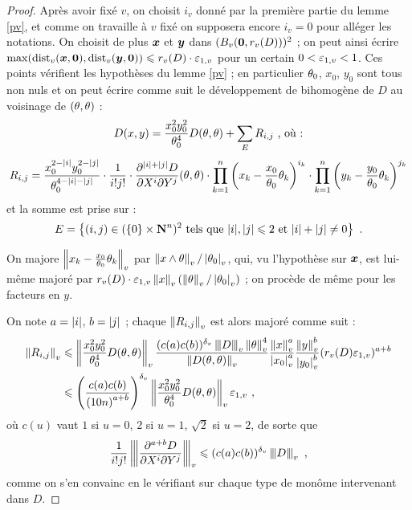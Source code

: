 \begin{proof}
  Après avoir fixé $v$, on choisit $i_v$ donné par la première partie du lemme
  \ref{pv}, et comme on travaille à $v$ fixé on supposera encore $i_v = 0$
  pour alléger les notations. On choisit de plus ${\boldsymbol{x}}$ et ${\boldsymbol{y}}$ dans
  $(B_v({\boldsymbol{0}}, r_v(D)))^2$ ; on peut ainsi écrire $\max(\mathrm{dist}_v({\boldsymbol{x}}, {\boldsymbol{0}}), \mathrm{dist}_v({\boldsymbol{y}}, {\boldsymbol{0}})) \leqslant r_v(D)\cdot\varepsilon_{1, v}$ pour un certain $0 < \varepsilon_{1, v} < 1$.
  Ces points vérifient  les hypothèses du lemme \ref{pv} ; en
  particulier $\theta_0$, $x_0$, $y_0$ sont tous non nuls et on peut écrire
  comme suit le développement de  bihomogène de $D$ au voisinage
  de $(\theta, \theta)$ :
  \[
  D(x, y) = \frac{x_0^2y_0^2}{\theta_0^4}D(\theta, \theta) + \sum_E R_{i, j}
  \text{ , où :}
  \]
  \[
  R_{i, j} =
  \frac{x_0^{2-{|i|}}y_0^{2-{|j|}}}{\theta_0^{4-{|i|}-{|j|}}}\cdot
  \frac{1}{i!j!} \cdot
  \frac{\partial^{{|i|}+{|j|}}D}{\partial X^i \partial Y^j}(\theta, \theta)
  \cdot
  \prod_{k=1}^n \left( x_{k} - \frac{x_0}{\theta_0} \theta_{k} \right)^{i_k}
  \cdot \prod_{k=1}^n \left( y_{k} - \frac{y_0}{\theta_0} \theta_{k}
  \right)^{j_k}
  \]
  et la somme est prise sur :
  \[
  E = \left\{ (i, j) \in (\{0\} \times \mathbf{N}^n)^2 \text{ tels que }
    {|i|},{|j|} \leqslant 2 \text{ et } {|i|}+{|j|} \neq 0 \right\}
  \text{ .}
  \]

  On majore $\left\lVert x_k - \frac{x_0}{\theta_0} \theta_k\right\rVert_{v}$ par $\left\lVert x \wedge
  \theta\right\rVert_{v}/\left\lvert\theta_0\right\rvert_{v}$, qui, vu l'hypothèse sur ${\boldsymbol{x}}$, est lui-même majoré
  par $r_v(D)\cdot\varepsilon_{1, v} \left\lVert x\right\rVert_{v} (\left\lVert\theta\right\rVert_{v}/\left\lvert\theta_0\right\rvert_{v})$ ; on procède de
  même pour les facteurs en $y$.

  On note $a = {|i|}$, $b={|j|}$ ; chaque $\left\lVert R_{i, j}\right\rVert_{v}$ est alors majoré
  comme suit :
  \begin{align*}
  \left\lVert R_{i, j}\right\rVert_{v} & \leqslant
  \left\lVert\frac{x_0^2y_0^2}{\theta_0^4}D(\theta, \theta)\right\rVert_{v}
  \frac{(c(a)c(b))^{\delta_v} \left\lvert\hspace{-1pt} \left\lvert\hspace{-1pt} \left\lvert D\right\rvert \hspace{-1pt}\right\rvert \hspace{-1pt}\right\rvert_{v}\left\lVert\theta\right\rVert_{v}^4}{\left\lVert D(\theta, \theta)\right\rVert_{v}}
  \frac{\left\lVert x\right\rVert_{v}^a}{\left\lvert x_0\right\rvert_{v}^a} \frac{\left\lVert y\right\rVert_{v}^b}{\left\lvert y_0\right\rvert_{v}^b} (r_v(D)\varepsilon_{1,
    v})^{a+b}\\
  & \leqslant \left( \frac{c(a)c(b)}{\left( 10n \right)^{a+b}} \right)^{\delta_v}
  \left\lVert\frac{x_0^2y_0^2}{\theta_0^4}D(\theta, \theta)\right\rVert_{v} \varepsilon_{1, v} \text{ ,}
  \end{align*}
  où $c(u)$ vaut $1$ si $u=0$, $2$ si $u=1$, $\sqrt{2}$ si $u=2$, de sorte que
  \[
  \frac{1}{i!j!}\left\lvert\hspace{-1pt} \left\lvert\hspace{-1pt} \left\lvert\frac{\partial^{a+b}D}{\partial X^i \partial Y^j}\right\rvert \hspace{-1pt}\right\rvert \hspace{-1pt}\right\rvert_{v} \leqslant
  (c(a) c(b))^{\delta_v} \left\lvert\hspace{-1pt} \left\lvert\hspace{-1pt} \left\lvert D\right\rvert \hspace{-1pt}\right\rvert \hspace{-1pt}\right\rvert_{v}\text{ ,}
  \]
  comme on s'en convainc en le vérifiant sur chaque type de monôme intervenant
  dans $D$.


\end{proof}
